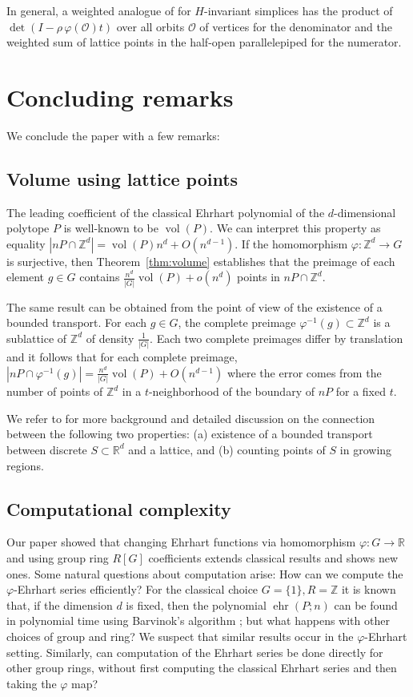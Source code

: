 \documentclass[12pt,reqno]{amsart}
\theoremstyle{definition}
\theoremstyle{remark}
\DeclareMathOperator{\vol}{vol}
\newcommand{\R}{\mathbb{R}}
\newcommand{\Z}{\mathbb{Z}}
\renewcommand{\phi}{\varphi}
\DeclareMathOperator{\ehr}{ehr}
\begin{document}
 In general, a weighted analogue of \cite[Proposition~6.1]{StapledonEquivariant} for $H$-invariant simplices has the product of $\det(I-\rho \,\varphi(\mathcal{O}) t)$ over all orbits $\mathcal{O}$ of vertices for the denominator and the weighted sum of lattice points in the half-open parallelepiped for the numerator. 



\section{Concluding remarks}
We conclude the paper with a few remarks: 

\subsection{Volume using lattice points}

The leading coefficient of the classical Ehrhart polynomial of the $d$-dimensional polytope $P$ is well-known to be $\vol (P)$. We can interpret this property as equality $|nP\cap \Z^d|=\vol(P)n^d+O(n^{d-1})$. If the homomorphism $\phi:\Z^d\longrightarrow G$ is surjective, then Theorem~\ref{thm:volume} establishes that the preimage of each element $g\in G$ contains $\frac{n^d}{|G|}\vol(P)+o(n^d)$ points in $nP\cap \Z^d$.

The same result can be obtained from the point of view of the existence of a bounded transport. For each $g\in G$, the complete preimage $\phi^{-1}(g)\subset \Z^d$ is a sublattice of $\Z^d$ of density $\frac{1}{|G|}$. Each two complete preimages differ by translation and it follows that for each complete preimage, $|nP\cap \phi^{-1}(g)|=\frac{n^d}{|G|}\vol(P)+O(n^{d-1})$ where the error comes from the number of points of $\Z^d$ in a $t$-neighborhood of the boundary of $nP$ for a fixed $t$.

We refer to \cite{frettloeh2022,laczkovich1992} for more background and detailed discussion on the connection between the following two properties: (a) existence of a bounded transport between discrete $S\subset \R^d$ and a lattice, and (b) counting points of $S$ in growing regions.

\subsection{Computational complexity}

Our paper showed that changing Ehrhart functions via homomorphism $\phi : G \to \mathbb{R}$ and using group ring $R[G]$ coefficients extends classical results and shows new ones. Some natural questions about computation arise: How can we compute the $\phi$-Ehrhart series efficiently? For the classical choice $G=\{1\}, R=\Z$ it is known that, if the dimension $d$ is fixed, then the polynomial $\ehr(P;n)$ can be found in polynomial time using Barvinok's algorithm \cite{barvinok-1993:exponential-sums}; but what happens with other choices of group and ring? We suspect that similar results occur in the $\phi$-Ehrhart setting. Similarly, can computation of the Ehrhart series be done directly for other group rings, without first computing the classical Ehrhart series and then taking the $\phi$ map?
\end{document}
